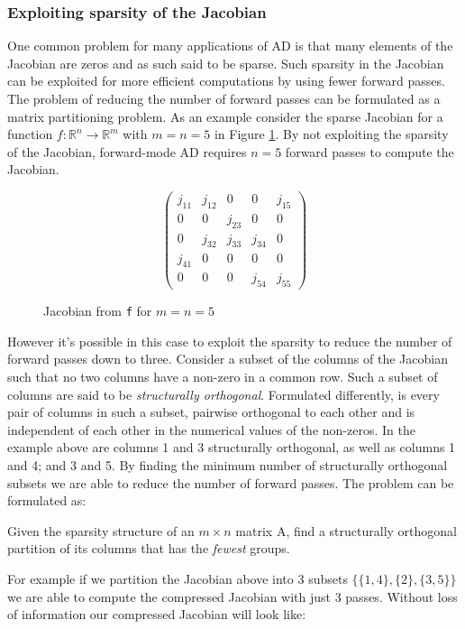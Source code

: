 \subsubsection*{Exploiting sparsity of the Jacobian}
One common problem for many applications of AD is that many elements of the Jacobian
are zeros and as such said to be sparse. Such sparsity in the Jacobian can 
be exploited for more efficient computations by using fewer forward passes. The problem
of reducing the number of forward passes can be formulated as a matrix partitioning problem. 
As an example consider the sparse Jacobian for a function $f: \mathbb{R}^n \to  \mathbb{R}^m$ with $m=n=5$ in Figure \ref{fig:jacobian}. By not exploiting the sparsity of the Jacobian, forward-mode AD requires $n=5$ forward passes to compute the Jacobian.
\begin{figure}[H]
	$$ \left(\begin{matrix}
    j_{11} & j_{12} & 0 & 0 & j_{15} \\
    0 & 0 & j_{23} & 0 & 0 \\
    0 & j_{32} & j_{33} & j_{34} & 0 \\
    j_{41} & 0 & 0 & 0 & 0 \\
    0 & 0 & 0 & j_{54} & j_{55} 
	\end{matrix}\right) $$
	\caption{Jacobian from \texttt{f} for $m=n=5$}
	\label{fig:jacobian}
\end{figure}
However it's possible in this case to exploit the sparsity to reduce the number of forward passes down to three. Consider a subset of the columns of the Jacobian such that no two columns have a non-zero in a common row. Such a subset of columns are said to be \emph{structurally orthogonal}. Formulated differently, is every pair of columns in such a subset, pairwise orthogonal to each other and is independent of each other in the numerical values of the non-zeros. In the example above are columns 1 and 3 structurally orthogonal, as well as columns 1 and 4; and 3 and 5. By finding the minimum number of structurally orthogonal subsets we are able to reduce the number of forward passes. 
The problem can be formulated as:
\begin{problem}
	Given the sparsity structure of an $m \times n$ matrix A, find a structurally orthogonal partition of its columns that has the \emph{fewest} groups.
	\label{prob:p1}
\end{problem}
For example if we partition the Jacobian above into 3 subsets $\{\{1,4\}, \{2\}, \{3,5\}\}$ we are able to compute the compressed Jacobian with just 3 passes. Without loss of information our compressed Jacobian will look like: 
